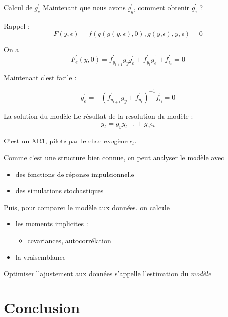 \documentclass[
  ignorenonframetext,
]{beamer}
\providecommand{\tightlist}{%
  \setlength{\itemsep}{0pt}\setlength{\parskip}{0pt}}
\begin{document}
\begin{frame}{Calcul de \(g^{\prime}_{e}\)}
\label{calcul-de-gprime_e}
Maintenant que nous avons \(g^{\prime}_y\), comment obtenir
\(g^{\prime}_{e}\) ?

Rappel :
\[F(y,\epsilon) = f(g(g(y,\epsilon),0), g(y,\epsilon), y, \epsilon) = 0\]

On a
\[F^{\prime}_e(\overline{y}, 0) =  f^{\prime}_{y_{t+1}}  g^{\prime}_y  g^{\prime}_e + f^{\prime}_{y_{t}} g^{\prime}_e + f^{\prime}_{\epsilon_t} = 0 \]

Maintenant c'est facile :

\[g^{\prime}_e = - (f^{\prime}_{y_{t+1}}  g^{\prime}_y + f^{\prime}_{y_{t}} )^{-1}  f^{\prime}_{\epsilon_t} = 0 \]
\end{frame}

\begin{frame}{La solution du modèle}
\label{la-solution-du-moduxe8le}
Le résultat de la résolution du modèle :
\[y_t = g_y y_{t-1} + g_e \epsilon_t\]

C'est un AR1, piloté par le choc exogène \(\epsilon_t\).

\pause

Comme c'est une structure bien connue, on peut analyser le modèle avec

\begin{itemize}
\tightlist
\item
  des fonctions de réponse impulsionnelle
\item
  des simulations stochastiques
\end{itemize}

\pause

Puis, pour comparer le modèle aux données, on calcule

\begin{itemize}
\tightlist
\item
  les moments implicites :

  \begin{itemize}
  \tightlist
  \item
    covariances, autocorrélation
  \end{itemize}
\item
  la vraisemblance
\end{itemize}

Optimiser l'ajustement aux données s'appelle l'estimation du
\emph{modèle}
\end{frame}

\section{Conclusion}\label{sec-conclusion}
\end{document}
